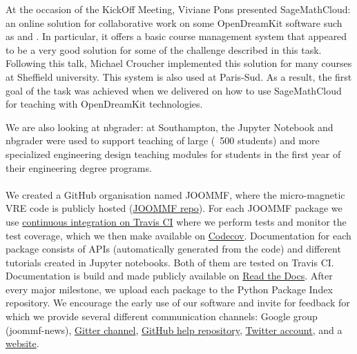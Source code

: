\documentclass{deliverablereport}
\begin{document}
At the occasion of the KickOff Meeting, Viviane Pons presented SageMathCloud: an online solution for collaborative
work on some OpenDreamKit software such as \Sage and \Jupyter. In particular, it offers a basic course management system that appeared to be a very good solution for some of the challenge described in this task. Following this talk, Michael Croucher implemented this solution for many courses at Sheffield university. This system is also used at Paris-Sud. As a result, the first goal of the task was achieved when we delivered  on how to use SageMathCloud for teaching with OpenDreamKit technologies. 

We are also looking at nbgrader: at Southampton, the Jupyter Notebook and nbgrader were used to support teaching of large (~500 students) and more specialized engineering design teaching modules for students in the first year of their engineering degree programs.

\paragraph{}

We created a GitHub organisation named JOOMMF, where the micro-magnetic VRE code is publicly hosted (\href{https://github.com/joommf}{JOOMMF repo}). For each JOOMMF package we use \href{https://travis-ci.org/joommf/discretisedfield}{continuous integration on Travis CI} where we perform tests and monitor the test coverage, which we then make available on \href{https://codecov.io/}{Codecov}. Documentation for each package consists of APIs (automatically generated from the code) and different tutorials created in Jupyter notebooks. Both of them are tested on Travis CI. Documentation is build and made publicly available on \href{http://discretisedfield.readthedocs.io}{Read the Docs}. After every major milestone, we upload each package to the Python Package Index repository. We encourage the early use of our software and invite for feedback for which we provide several different communication channels: Google group (joommf-news), \href{https://gitter.im/joommf/}{Gitter channel}, \href{https://github.com/joommf/help}{GitHub help repository}, \href{https://twitter.com/joommf}{Twitter account}, and a \href{http://joommf.github.io/}{website}.

\paragraph{}
\end{document}
